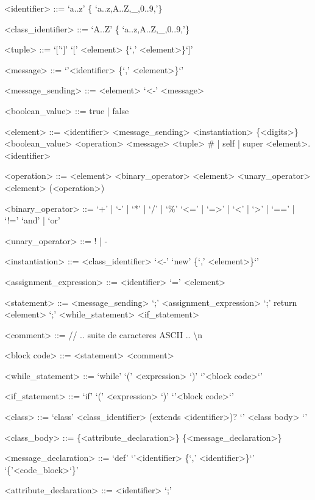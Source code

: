 \documentclass{eplDoc}
\begin{document}
\begin{grammar}
<identifier> ::= `a..z' \{ `a..z,A..Z,\_,0..9,'\} 

<class\_identifier> ::= `A..Z' \{ `a..z,A..Z,\_,0..9,'\} 

<tuple> ::= `['`]' \alt `[' <element> \{`,' <element>\}`]'

<message> ::= `{'<identifier> \{`,' <element>\}`}'

<message\_sending> ::= <element> `<-' <message>

<boolean\_value> ::= true | false

<element> ::= <identifier> 
\alt<message\_sending>
\alt<instantiation>
\alt \{<digits>\}
\alt <boolean\_value>
\alt <operation>
\alt <message>
\alt <tuple>
\alt \# | self | super
\alt <element>.<identifier> 

<operation> ::= <element> <binary\_operator> <element>
\alt <unary\_operator> <element>
\alt (<operation>)

<binary\_operator> ::= `+' | `-' | `*' | `/' | `\%' 
\alt `<=' | `=>' | `<' | `>' | `==' | `!=' 
\alt `and' | `or'

<unary\_operator> ::= ! | - 

<instantiation> ::= <class\_identifier> `<-' `{new' \{`,' <element>\}`}'


<assignment\_expression> ::= <identifier> `=' <element>

<statement> ::= <message\_sending> `;'
\alt <assignment\_expression> `;'
\alt return <element> `;'
\alt <while\_statement>
\alt <if\_statement>

<comment> ::= // .. suite de caracteres ASCII .. \textbackslash n

<block code> ::= { <statement> } { <comment> } 

<while\_statement> ::= `while' `(' <expression> `)'  `{'<block code>`}'

<if\_statement> ::= `if' `(' <expression> `)'  `{'<block code>`}'




<class> ::= `class' <class\_identifier> (extends <identifier>)? `{' <class body> `}'

<class\_body> ::= \{<attribute\_declaration>\} \{<message\_declaration>\}

<message\_declaration> ::= `def'  `{'<identifier> \{`,' <identifier>\}`}' `\{'<code\_block>`\}'

<attribute\_declaration> ::= <identifier> `;'

\end{grammar}
\end{document}
